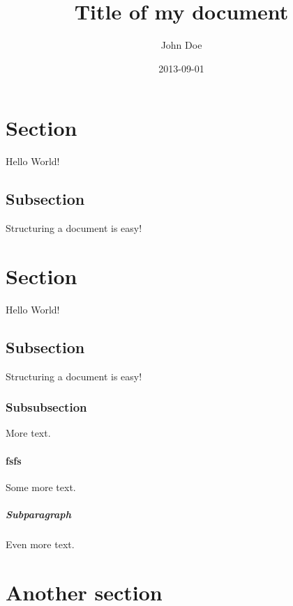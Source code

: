 \documentclass{article}
\title{Title of my document}
\date{2013-09-01}
\author{John Doe}
\begin{document}
\maketitle
{}
\newpage
{}



\section{Section} %

Hello World!

\subsection{Subsection} %

Structuring a document is easy!




\section{Section} %

Hello World!

\subsection{Subsection} %

Structuring a document is easy!

\subsubsection{Subsubsection} %

More text. %

{\setlength{\parindent}{0cm} %

\paragraph{fsfs} %

Some more text.

\subparagraph{Subparagraph} %
Even more text.
}


\section{Another section} %
\end{document}
